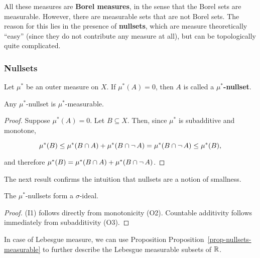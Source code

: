 All these measures are \textbf{Borel measures}, in the sense that the Borel sets are measurable. However, there are measurable sets that are not Borel sets. The reason for this lies in the presence of \textbf{nullsets}, which are measure theoretically ``easy'' (since they do not contribute any measure at all), but can be topologically quite complicated.

\subsubsection{Nullsets}

Let $\mu^*$ be an outer measure on $X$. If $\mu^*(A) = 0$, then $A$ is called a \textbf{$\mu^*$-nullset}.

\begin{proposition}\label{prop-nullsets-measurable}Any $\mu^*$-nullset is $\mu^*$-measurable.

\end{proposition}\begin{proof}Suppose $\mu^*(A)=0$. Let $B \subseteq X$. Then, since $\mu^*$ is subadditive and monotone,

\begin{equation}
\mu^*(B) \leq \mu^*(B \cap A) + \mu^*(B \cap \neg \, A) = \mu^*(B \cap \neg \, A) \leq \mu^*(B),
\end{equation}

and therefore $\mu^*(B) = \mu^*(B \cap A) + \mu^*(B \cap \neg \, A)$.

\end{proof}The next result confirms the intuition that nullsets are a notion of smallness.

\begin{proposition}\label{prop-null-sigmaideal}The $\mu^*$-nullsets form a $\sigma$-ideal.

\end{proposition}\begin{proof}(I1) follows directly from monotonicity (O2). Countable additivity follows immediately from subadditivity (O3).

\end{proof}In case of Lebesgue measure, we can use Proposition Proposition~\ref{prop-nullsets-measurable} to further describe the Lebesgue measurable subsets of $\mathbb{R}$.

